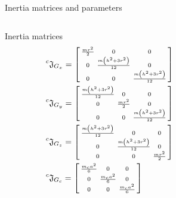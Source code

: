 \begin{frame}[shrink = 10]{Inertia matrices and parameters}
  \begin{columns}
    \begin{column}{0.55\textwidth}
      \begin{block}{Inertia matrices}
        \vskip-0.1in
        \[
        \begin{split}
          &\prescript{c}{}{\mathfrak{J}}_{G_{x}} = 
          \left[
            \begin{smallmatrix}
              \frac{m r^2}{2} & 0 & 0\\
              0 & \frac{m\left(h^2 + 3 r^2 \right)}{12}  & 0\\
              0 & 0 & \frac{m\left(h^2 + 3 r^2 \right)}{12}
            \end{smallmatrix}
            \right]\\
          &\prescript{c}{}{\mathfrak{J}}_{G_{y}} = 
          \left[
            \begin{smallmatrix}
              \frac{m\left(h^2 + 3 r^2 \right)}{12} & 0 & 0\\
              0 & \frac{m r^2}{2} & 0\\
              0 & 0 & \frac{m\left(h^2 + 3 r^2 \right)}{12}
            \end{smallmatrix}
            \right] \\
          &\prescript{c}{}{\mathfrak{J}}_{G_{z}} = 
          \left[
            \begin{smallmatrix}
              \frac{m\left(h^2 + 3 r^2 \right)}{12} & 0 & 0\\
              0 & \frac{m\left(h^2 + 3 r^2 \right)}{12} & 0\\
              0 & 0 & \frac{m r^2}{2}
            \end{smallmatrix}
            \right]
          \\
          &\prescript{c}{}{\mathfrak{J}}_{G_{c}} = 
          \left[
            \begin{smallmatrix}
              \frac{m_c a^2}{6} & 0 & 0\\
              0 & \frac{m_c a^2}{6} & 0\\
              0 & 0 & \frac{m_c a^2}{6}
            \end{smallmatrix}
            \right]
        \end{split}
        \] 
      \end{block}
    \end{column}
    \begin{column}{0.5\textwidth}

\end{column}
\end{columns}
\end{frame}
